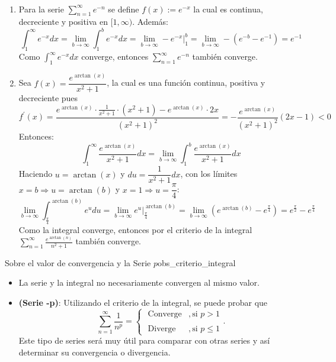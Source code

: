 \begin{soln}
    $\left. \right.$
    \begin{enumerate}
        \item Para la serie $\displaystyle \sum_{n=1}^{\infty}e^{-n}$ se define $f(x):=e^{-x}$ la cual es continua, decreciente y positiva en $[1, \infty)$. Además:
        \[ \int_{1}^{\infty}e^{-x}dx = \lim_{b\to\infty}\int_{1}^{b}e^{-x}dx = \lim_{b\to\infty} -e^{-x}\Big|_{1}^{b} = \lim_{b\to\infty} -(e^{-b}-e^{-1}) = e^{-1} \]
        Como $\displaystyle \int_{1}^{\infty}e^{-x}dx$ converge, entonces $\displaystyle \sum_{n=1}^{\infty}e^{-n}$ también converge.
        
        \item Sea $f(x) = \dfrac{e^{\arctan(x)}}{x^{2}+1}$, la cual es una función continua, positiva y decreciente pues
        \[ f^{\prime}(x) = \frac{e^{\arctan(x)}\cdot\frac{1}{x^{2}+1}\cdot(x^{2}+1) - e^{\arctan(x)}\cdot 2x}{(x^{2}+1)^{2}} = -\frac{e^{\arctan(x)}}{(x^{2}+1)^{2}}(2x-1) < 0 \]
        Entonces:
        \[ \int_{1}^{\infty}\frac{e^{\arctan(x)}}{x^{2}+1}dx = \lim_{b\to\infty}\int_{1}^{b}\frac{e^{\arctan(x)}}{x^{2}+1}dx \]
        Haciendo $u=\arctan(x)$ y $du=\dfrac{1}{x^{2}+1}dx$, con los límites $x=b \Rightarrow u=\arctan(b)$ y $x=1 \Rightarrow u=\dfrac{\pi}{4}$:
        \[ \lim_{b\to\infty}\int_{\frac{\pi}{4}}^{\arctan(b)}e^{u}du = \lim_{b\to\infty}e^{u}\Big|_{\frac{\pi}{4}}^{\arctan(b)} = \lim_{b\to\infty}(e^{\arctan(b)} - e^{\frac{\pi}{4}}) = e^{\frac{\pi}{2}} - e^{\frac{\pi}{4}} \]
        Como la integral converge, entonces por el criterio de la integral $\displaystyle \sum_{n=1}^{\infty}\frac{e^{\arctan(n)}}{n^{2}+1}$ también converge.
    \end{enumerate}
\end{soln}

\begin{remark}{Sobre el valor de convergencia y la Serie $p$}{obs_criterio_integral}
    \begin{itemize}
        \item La serie y la integral no necesariamente convergen al mismo valor.
        \item \textbf{(Serie -p)}: Utilizando el criterio de la integral, se puede probar que
        \[ \sum_{n=1}^{\infty}\frac{1}{n^{p}} = \begin{cases} \text{ Converge} & ,\text{si } p > 1 \\ & \\ \text{ Diverge} & ,\text{si } p \le 1 \end{cases}.\]
        Este tipo de series será muy útil para comparar con otras series y así determinar su convergencia o divergencia.
    \end{itemize}
\end{remark}

